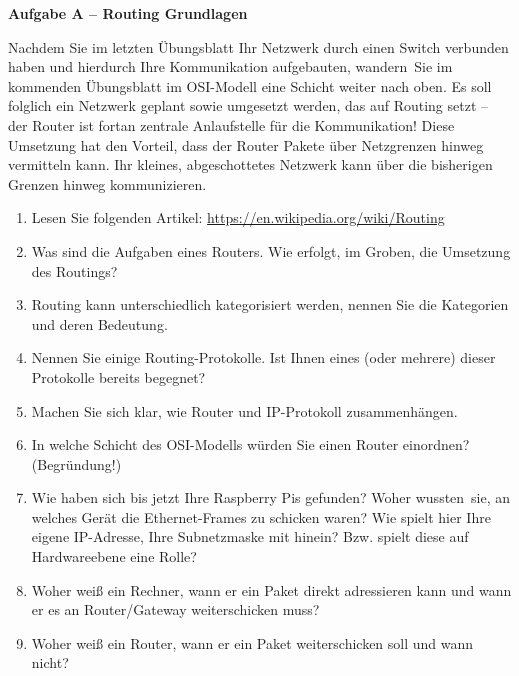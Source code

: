 \documentclass[paper=a4,fontsize=11pt]{scrartcl}%
\numberwithin{equation}{section}
\begin{document}
\begin{center}
\Large{\textbf{Aufgabe A -- Routing Grundlagen}}
\end{center}
\vskip0.25in
Nachdem Sie im letzten Übungsblatt Ihr Netzwerk durch einen Switch verbunden haben und hierdurch Ihre Kommunikation aufgebauten, \glqq wandern\grqq\ Sie im kommenden Übungsblatt im OSI-Modell eine Schicht weiter nach oben. Es soll folglich ein Netzwerk geplant sowie umgesetzt werden, das auf Routing setzt -- der Router ist fortan zentrale Anlaufstelle für die Kommunikation! Diese Umsetzung hat den Vorteil, dass der Router Pakete über Netzgrenzen hinweg vermitteln kann. Ihr kleines, abgeschottetes Netzwerk kann über die bisherigen Grenzen hinweg kommunizieren.
\begin{enumerate}
	\item Lesen Sie folgenden Artikel: \url{https://en.wikipedia.org/wiki/Routing}
	\item Was sind die Aufgaben eines Routers. Wie erfolgt, im Groben, die Umsetzung des Routings?
	\item Routing kann unterschiedlich kategorisiert werden, nennen Sie die Kategorien und deren Bedeutung.
	\item Nennen Sie einige Routing-Protokolle. Ist Ihnen eines (oder mehrere) dieser Protokolle bereits begegnet?
	\item Machen Sie sich klar, wie Router und IP-Protokoll zusammenhängen.
	\item In welche Schicht des OSI-Modells würden Sie einen Router einordnen? (Begründung!)
	\item Wie haben sich bis jetzt Ihre Raspberry Pis gefunden? Woher \glqq wussten\grqq\ sie, an welches Gerät die Ethernet-Frames zu schicken waren? Wie spielt hier Ihre eigene IP-Adresse, Ihre Subnetzmaske mit hinein? Bzw. spielt diese auf Hardwareebene eine Rolle?
	\item Woher weiß ein Rechner, wann er ein Paket direkt adressieren kann und wann er es an Router/Gateway weiterschicken muss?
	\item Woher weiß ein Router, wann er ein Paket weiterschicken soll und wann nicht?
\end{enumerate}
\end{document}
